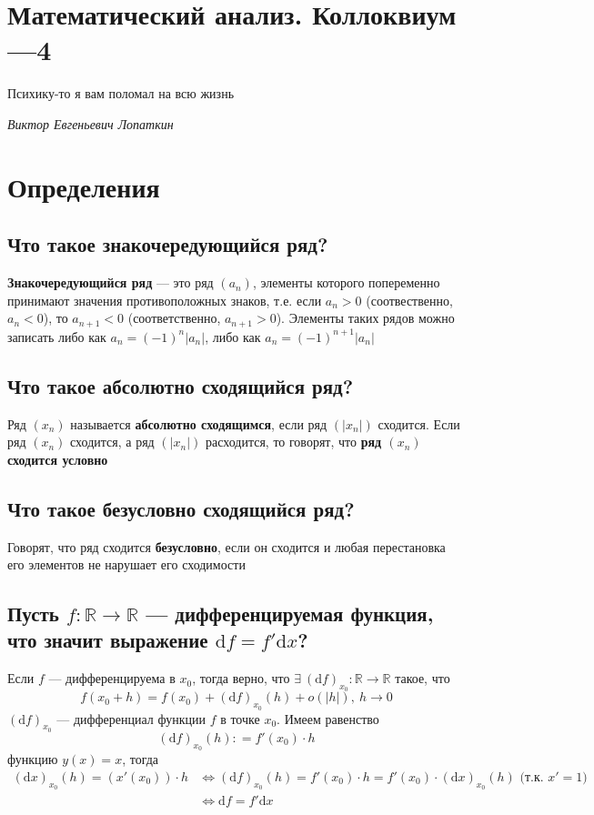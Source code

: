 \documentclass[a4paper]{article}
\begin{document}
\section*{\LARGE{Математический анализ. Коллоквиум—4}}
\epigraph{Психику-то я вам поломал на всю жизнь}%
{\textit{Виктор Евгеньевич Лопаткин}\\ \textsc{}}
\tableofcontents
\newpage
\section{Определения}
\subsection{Что такое знакочередующийся ряд?}
\textbf{Знакочередующийся ряд} — это ряд $(a_n)$, элементы которого попеременно принимают значения противоположных знаков, т.е. если $a_n>0$ (соотвественно, $a_n <0$), то $a_{n+1}<0$ (соответственно, $a_{n+1}>0$). Элементы таких рядов можно записать либо как $a_n  = (-1)^n |a_n|$, либо как $a_n = (-1)^{n+1}|a_n|$

\subsection{Что такое абсолютно сходящийся ряд?}
Ряд $(x_n)$ называется \textbf{абсолютно сходящимся}, если ряд $\left(|x_n|\right)$ сходится. Если ряд $(x_n)$ сходится, а ряд $(|x_n|)$ расходится, то говорят, что \textbf{ряд $(x_n)$ сходится условно}

\subsection{Что такое безусловно сходящийся ряд?}
Говорят, что ряд сходится \textbf{безусловно}, если он сходится и любая перестановка его элементов не нарушает его сходимости

\subsection{Пусть $f:\mathbb{R}\rightarrow\mathbb{R}$ — дифференцируемая функция, что значит выражение $\mathrm{d}f=f'\mathrm{d}x$?}
\label{1.4}
Если $f$ — дифференцируема в $x_0$, тогда верно, что $\exists\ (\mathrm{d}f)_{x_0}:\mathbb{R}\rightarrow\mathbb{R}$ такое, что
$$f(x_0+h)=f(x_0)+(\mathrm{d}f)_{x_0}(h)+o(\left|h\right|),\ h\rightarrow0$$
\indent $(\mathrm{d}f)_{x_0}$ — дифференциал функции $f$ в точке $x_0$. Имеем равенство
$$(\mathrm{d}f)_{x_0}(h): = f'(x_0)\cdot h$$
 функцию $y(x)=x$, тогда
$$\begin{aligned}
    (\mathrm{d}x)_{x_0}(h) = (x'(x_0))\cdot h&\Longleftrightarrow(\mathrm{d}f)_{x_0}(h) = f'(x_0) \cdot h = f'(x_0) \cdot  (\mathrm{d}x)_{x_0}(h)\text{ (т.к. }x'=1)\\
    &\Longleftrightarrow\boxed{\mathrm{d}f=f'\mathrm{d}x}
\end{aligned}$$
\end{document}

